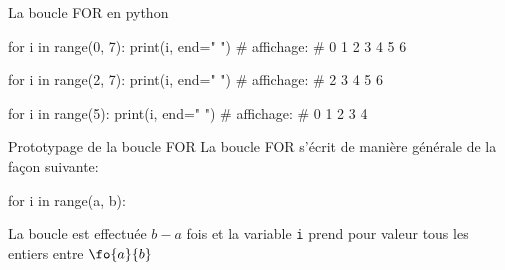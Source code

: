 	\begin{easybox}{La boucle FOR en python}
		\begin{minipage}[b]{0.33\linewidth}
			\begin{CodePythontexAlt}[TaillePolice=\normalsize, Largeur=1\linewidth,Centre,PremLigne=1, Lignes=false,]{}
for i in range(0, 7):
	print(i, end=" ")
# affichage: 
# 0 1 2 3 4 5 6
	
				\end{CodePythontexAlt}
		\end{minipage}\hfill
		\begin{minipage}[b]{0.33\linewidth}
			\begin{CodePythontexAlt}[TaillePolice=\normalsize, Largeur=1\linewidth,Centre,PremLigne=1, Lignes=false,]{}
for i in range(2, 7):
	print(i, end=" ")
# affichage: 
# 2 3 4 5 6
					
				\end{CodePythontexAlt}
		\end{minipage}\hfill
		 \begin{minipage}[b]{0.33\linewidth}
			\begin{CodePythontexAlt}[TaillePolice=\normalsize, Largeur=1\linewidth,Centre,PremLigne=1, Lignes=false,]{}
for i in range(5):
	print(i, end=" ")
# affichage: 
# 0 1 2 3 4
	
				\end{CodePythontexAlt}
		\end{minipage}
	\end{easybox}
	
	
	\begin{easybox}{Prototypage de la boucle FOR}
	La boucle FOR s'écrit de manière générale de la façon suivante:
	
	\medskip
	
	\begin{minipage}[b]{0.4\linewidth}
			\begin{CodePythontexAlt}[TaillePolice=\normalsize, Largeur=1\linewidth,Centre,PremLigne=1, Lignes=false,]{}
		for i in range(a, b):
	\end{CodePythontexAlt}
	\end{minipage}\hfill
	\begin{minipage}[b]{0.58\linewidth}
	La boucle est effectuée $b-a$ fois et la variable \verb+i+ prend pour valeur tous les entiers entre $\fo{a}{b}$
	\end{minipage}
	
	
	\end{easybox}
	

